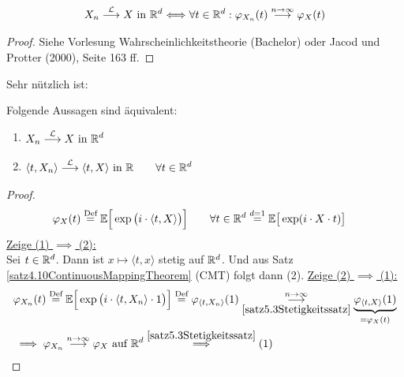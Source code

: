 \begin{satz}[Stetigkeitssatz]\label{satz5.3Stetigkeitssatz}
\begin{align*}
X_n\stackrel{\mathcal{L}}{\longrightarrow} X\text{ in }\mathbb{R}^d\Longleftrightarrow\forall t\in\mathbb{R}^d: \varphi_{X_n}(t)\stackrel{n\to\infty}{\longrightarrow}\varphi_X(t)
\end{align*}
\end{satz}
\begin{proof}
Siehe Vorlesung Wahrscheinlichkeitstheorie (Bachelor) oder Jacod und Protter (2000), Seite 163 ff.
\end{proof}

Sehr nützlich ist:

\begin{satz}\label{satz5.4CramerWoldDevice}\enter
Folgende Aussagen sind äquivalent:
\begin{enumerate}[label=(\arabic*)]
\item $\begin{aligned}
X_n\stackrel{\mathcal{L}}{\longrightarrow} X\text{ in }\mathbb{R}^d
\end{aligned}$
\item $\begin{aligned}
\langle t, X_n\rangle\stackrel{\mathcal{L}}{\longrightarrow}\langle t, X\rangle\text{ in }\mathbb{R}\qquad\forall t\in\mathbb{R}^d
\end{aligned}$
\end{enumerate}
\end{satz}
\begin{proof}
\begin{align*}
\varphi_X(t)
&\stackrel{\text{Def}}{=}\mathbb{E}\Big[\exp\big(i\cdot\langle t,X\rangle\big)\Big]\qquad\forall t\in\mathbb{R}^d
\stackrel{d=1}{=}\mathbb{E}\big[\exp(i\cdot X\cdot t)\big]
\end{align*}
\underline{Zeige (1) $\implies$ (2):}\\
Sei $t\in\mathbb{R}^d$. Dann ist $x\mapsto\langle t,x\rangle$ stetig auf $\mathbb{R}^d$. Und aus Satz \ref{satz4.10ContinuousMappingTheorem} (CMT) folgt dann (2).\nl
\underline{Zeige (2) $\implies$ (1):}
\begin{align*}
&\varphi_{X_n}(t)
\stackrel{\text{Def}}{=}\mathbb{E}\Big[\exp\big(i\cdot\langle t,X_n\rangle\cdot 1\big)\Big]
\stackrel{\text{Def}}{=}\varphi_{\langle t,X_n\rangle}(1)
\underset{\ref{satz5.3Stetigkeitssatz}}{\overset{n\to\infty}{\longrightarrow}}\underbrace{\varphi_{\langle t,X\rangle}(1)}_{=\varphi_X(t)}\\
&\implies\varphi_{X_n}\stackrel{n\to\infty}{\longrightarrow}\varphi_X\text{ auf }\mathbb{R}^d
\stackrel{\ref{satz5.3Stetigkeitssatz}}{\implies}(1)
\end{align*}
\end{proof}

